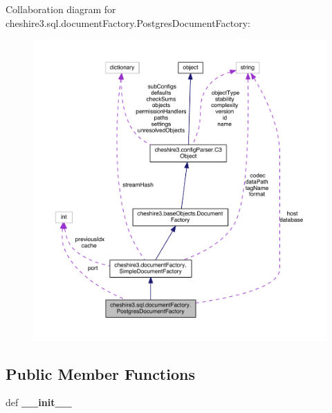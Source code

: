 Collaboration diagram for cheshire3.\-sql.\-document\-Factory.\-Postgres\-Document\-Factory\-:
\nopagebreak
\begin{figure}[H]
\begin{center}
\leavevmode
\includegraphics[width=350pt]{classcheshire3_1_1sql_1_1document_factory_1_1_postgres_document_factory__coll__graph}
\end{center}
\end{figure}
\subsection*{Public Member Functions}
\begin{DoxyCompactItemize}
\item 
\hypertarget{classcheshire3_1_1sql_1_1document_factory_1_1_postgres_document_factory_a8bba765f2a9e23d5ea97d972c4ab2d49}{def {\bfseries \-\_\-\-\_\-init\-\_\-\-\_\-}}\label{classcheshire3_1_1sql_1_1document_factory_1_1_postgres_document_factory_a8bba765f2a9e23d5ea97d972c4ab2d49}

\end{DoxyCompactItemize}
